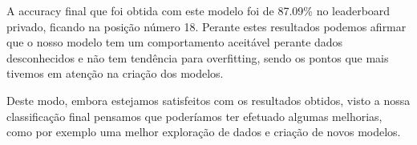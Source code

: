 A accuracy final que foi obtida com este modelo foi de 87.09\% no leaderboard privado, ficando na posição número 18. Perante estes resultados podemos afirmar que o nosso modelo tem um comportamento aceitável perante dados desconhecidos e não tem tendência para overfitting, sendo os pontos que mais tivemos em atenção na criação dos modelos.

Deste modo, embora estejamos satisfeitos com os resultados obtidos, visto a nossa classificação final pensamos que poderíamos ter efetuado algumas melhorias, como por exemplo uma melhor exploração de dados e criação de novos modelos.
